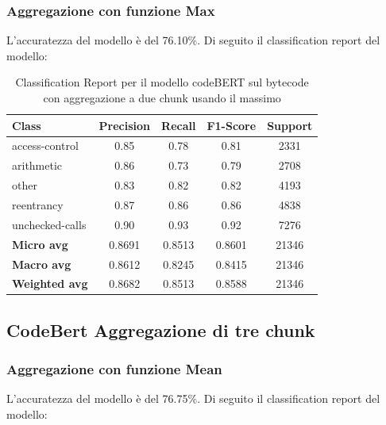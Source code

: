 \documentclass[../../Thesis.tex]{subfiles}
\begin{document}
    

\subsubsection{Aggregazione con funzione Max}
L'accuratezza del modello \`e del 76.10\%. Di seguito il classification report del modello:
\begin{table}[H]
    \centering
    \small
    \begin{tabular}{lcccc}
    \hline
    \textbf{Class} & \textbf{Precision} & \textbf{Recall} & \textbf{F1-Score} & \textbf{Support} \\
    \hline
    access-control & 0.85 & 0.78 & 0.81 & 2331 \\
    arithmetic & 0.86 & 0.73 & 0.79 & 2708 \\
    other & 0.83 & 0.82 & 0.82 & 4193 \\
    reentrancy & 0.87 & 0.86 & 0.86 & 4838 \\
    unchecked-calls & 0.90 & 0.93 & 0.92 & 7276 \\
    \hline
    \textbf{Micro avg} & 0.8691 & 0.8513 & 0.8601 & 21346 \\
    \textbf{Macro avg} & 0.8612 & 0.8245 & 0.8415 & 21346 \\
    \textbf{Weighted avg} & 0.8682 & 0.8513 & 0.8588 & 21346 \\
    \hline
    \end{tabular}
    \caption{Classification Report per il modello codeBERT sul bytecode con aggregazione a due chunk usando il massimo}
    \end{table}

\subsection{CodeBert Aggregazione di tre chunk}
    \subsubsection{Aggregazione con funzione Mean}
    L'accuratezza del modello \`e del 76.75\%. Di seguito il classification report del modello:
    
\end{document}
